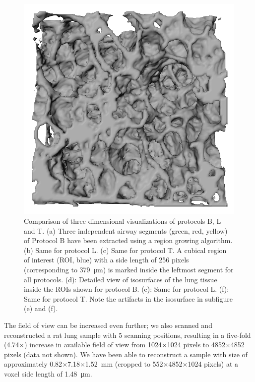 \begin{figure}[htp]
		\includegraphics[width=\imagewidth]{img/comparisonBvsT/roiT}%
		\caption{%
			Comparison of three-dimensional visualizations of protocols B, L and T. %
			(a) Three independent airway segments (green, red, yellow) of Protocol B have been extracted using a region growing algorithm. %
			(b) Same for protocol L. %
			(c) Same for protocol T. A cubical region of interest (ROI, blue) with a side length of 256 pixels (corresponding to \SI{379}{\micro\meter}) is marked inside the leftmost segment for all protocols. %
			(d): Detailed view of isosurfaces of the lung tissue inside the ROIs shown for protocol B. %
			(e): Same for protocol L.
			(f): Same for protocol T. Note the artifacts in the isosurface in subfigure (e) and (f).%
			}%
		\label{fig:BvsT}%
	\end{figure}
\fi%

The field of view can be increased even further; we also scanned and reconstructed a rat lung sample with 5 scanning positions, resulting in a five-fold (4.74$\times$) increase in available field of view from 1024$\times$1024 pixels to 4852$\times$4852 pixels (data not shown). We have been able to reconstruct a sample with size of approximately 0.82$\times$7.18$\times$\SI{1.52}{\milli\meter} (cropped to 552$\times$4852$\times$1024 pixels) at a voxel side length of \SI{1.48}{\micro\meter}.